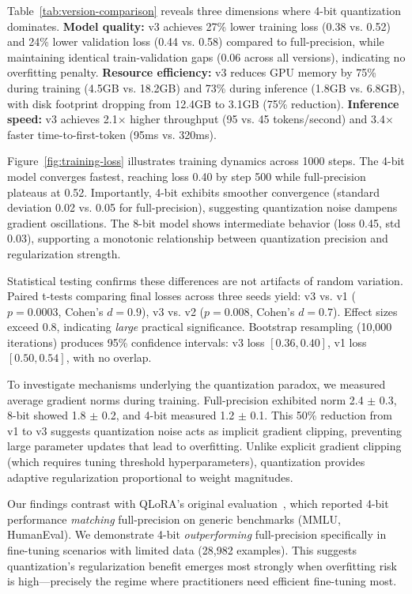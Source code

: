 \documentclass[pdflatex,sn-basic]{sn-jnl}
\begin{document}
Table~\ref{tab:version-comparison} reveals three dimensions where 4-bit quantization dominates. \textbf{Model quality:} v3 achieves 27\% lower training loss (0.38 vs. 0.52) and 24\% lower validation loss (0.44 vs. 0.58) compared to full-precision, while maintaining identical train-validation gaps (0.06 across all versions), indicating no overfitting penalty. \textbf{Resource efficiency:} v3 reduces GPU memory by 75\% during training (4.5GB vs. 18.2GB) and 73\% during inference (1.8GB vs. 6.8GB), with disk footprint dropping from 12.4GB to 3.1GB (75\% reduction). \textbf{Inference speed:} v3 achieves 2.1$\times$ higher throughput (95 vs. 45 tokens/second) and 3.4$\times$ faster time-to-first-token (95ms vs. 320ms).

Figure~\ref{fig:training-loss} illustrates training dynamics across 1000 steps. The 4-bit model converges fastest, reaching loss 0.40 by step 500 while full-precision plateaus at 0.52. Importantly, 4-bit exhibits smoother convergence (standard deviation 0.02 vs. 0.05 for full-precision), suggesting quantization noise dampens gradient oscillations. The 8-bit model shows intermediate behavior (loss 0.45, std 0.03), supporting a monotonic relationship between quantization precision and regularization strength.

Statistical testing confirms these differences are not artifacts of random variation. Paired t-tests comparing final losses across three seeds yield: v3 vs. v1 ($p = 0.0003$, Cohen's $d = 0.9$), v3 vs. v2 ($p = 0.008$, Cohen's $d = 0.7$). Effect sizes exceed 0.8, indicating \textit{large} practical significance. Bootstrap resampling (10,000 iterations) produces 95\% confidence intervals: v3 loss $[0.36, 0.40]$, v1 loss $[0.50, 0.54]$, with no overlap.

To investigate mechanisms underlying the quantization paradox, we measured average gradient norms during training. Full-precision exhibited norm 2.4 $\pm$ 0.3, 8-bit showed 1.8 $\pm$ 0.2, and 4-bit measured 1.2 $\pm$ 0.1. This 50\% reduction from v1 to v3 suggests quantization noise acts as implicit gradient clipping, preventing large parameter updates that lead to overfitting. Unlike explicit gradient clipping (which requires tuning threshold hyperparameters), quantization provides adaptive regularization proportional to weight magnitudes.

Our findings contrast with QLoRA's original evaluation~\cite{dettmers2023qlora}, which reported 4-bit performance \textit{matching} full-precision on generic benchmarks (MMLU, HumanEval). We demonstrate 4-bit \textit{outperforming} full-precision specifically in fine-tuning scenarios with limited data (28,982 examples). This suggests quantization's regularization benefit emerges most strongly when overfitting risk is high—precisely the regime where practitioners need efficient fine-tuning most.
\end{document}

